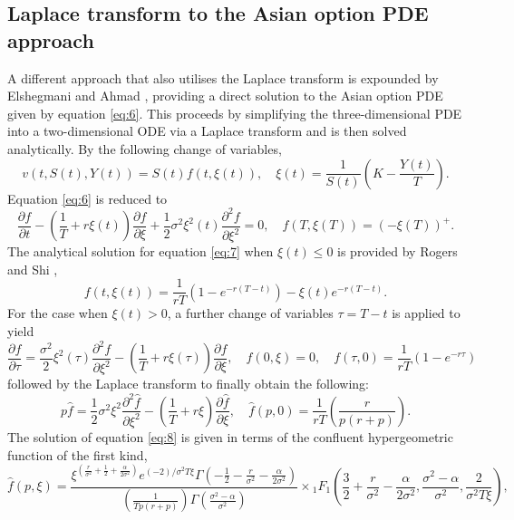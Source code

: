 \subsection{Laplace transform to the Asian option PDE approach}

A different approach that also utilises the Laplace transform is expounded by Elshegmani and Ahmad \cite{laplacePDE}, providing a direct solution to the Asian option PDE given by equation \eqref{eq:6}. This proceeds by simplifying the three-dimensional PDE into a two-dimensional ODE via a Laplace transform and is then solved analytically.
By the following change of variables,
\[
    v(t, S(t), Y(t)) = S(t) f(t, \xi(t)), \quad \xi(t) = \frac{1}{S(t)} \left( K - \frac{Y(t)}{T}\right).
\]
Equation \eqref{eq:6} is reduced to
\begin{equation}
    \frac{\partial f}{\partial t}-\left(\frac{1}{T}+r \xi (t)\right) \frac{\partial f}{\partial \xi}+\frac{1}{2} \sigma^2 \xi^2(t) \frac{\partial^2 f}{\partial \xi^2}=0, \quad f(T, \xi(T)) = \left(-\xi(T)\right)^+. \label{eq:7}
\end{equation}
The analytical solution for equation \eqref{eq:7} when \(\xi(t) \leq 0\) is provided by Rogers and Shi \cite{rogers1995asian},
\[
f(t, \xi(t))=\frac{1}{r T}\left(1-e^{-r(T-t)}\right)-\xi(t) e^{-r(T-t)}.
\]
For the case when \(\xi(t) > 0\), a further change of variables \(\tau = T-t\) is applied to yield
\[
    \frac{\partial f}{\partial \tau}=\frac{\sigma^2}{2} \xi^2(\tau) \frac{\partial^2 f}{\partial \xi^2}-\left(\frac{1}{T}+r \xi(\tau)\right) \frac{\partial f}{\partial \xi}, \quad f(0, \xi)=0, \quad f(\tau, 0)=\frac{1}{r T}\left(1-e^{-r \tau}\right)
\]
followed by the Laplace transform to finally obtain the following:
\begin{equation}
    p \hat{f}=\frac{1}{2} \sigma^2 \xi^2 \frac{\partial^2 \hat{f}}{\partial \xi^2}-\left(\frac{1}{T}+r \xi\right) \frac{\partial \hat{f}}{\partial \xi}, \quad \hat{f}(p, 0)=\frac{1}{r T}\left(\frac{r}{p(r+p)}\right).\label{eq:10}
\end{equation}
The solution of equation \eqref{eq:8} is given in terms of the confluent hypergeometric function of the first kind,
\begin{equation}
    \hat{f}(p, \xi) =\frac{\xi^{\left(\frac{r}{\sigma^2}+\frac{1}{2} + \frac{\alpha}{2 \sigma^2}\right)} e^{(-2) / \sigma^2 T \xi} \Gamma\left(-\frac{1}{2}-\frac{r}{\sigma^2}-\frac{\alpha}{2 \sigma^2}\right)}{\left(\frac{1}{T p(r+p)}\right) \Gamma\left(\frac{\sigma^2-\alpha}{\sigma^2}\right)} \times { }_1 F_1\left(\frac{3}{2}+\frac{r}{\sigma^2}-\frac{\alpha}{2 \sigma^2}, \frac{\sigma^2-\alpha}{\sigma^2}, \frac{2}{\sigma^2 T \xi}\right),
\end{equation}
